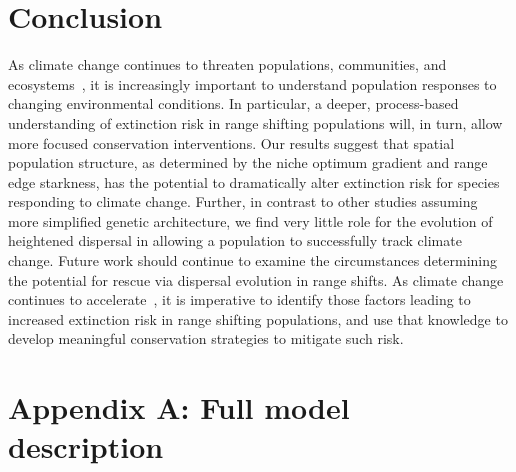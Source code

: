 \documentclass[11pt]{article}
\begin{document}
\section*{Conclusion}
As climate change continues to threaten populations, communities, and ecosystems~\citep{chen2011rapid, hobbs2009novel, gonzalez2010global}, it is increasingly important to understand population responses to changing environmental conditions. In particular, a deeper, process-based understanding of extinction risk in range shifting populations will, in turn, allow more focused conservation interventions. Our results suggest that spatial population structure, as determined by the niche optimum gradient and range edge starkness, has the potential to dramatically alter extinction risk for species responding to climate change. Further, in contrast to other studies assuming more simplified genetic architecture, we find very little role for the evolution of heightened dispersal in allowing a population to successfully track climate change. Future work should continue to examine the circumstances determining the potential for rescue via dispersal evolution in range shifts. As climate change continues to accelerate~\citep{chen2017increasing}, it is imperative to identify those factors leading to increased extinction risk in range shifting populations, and use that knowledge to develop meaningful conservation strategies to mitigate such risk.



\newpage{}

\section*{Appendix A: Full model description}


\end{document}
